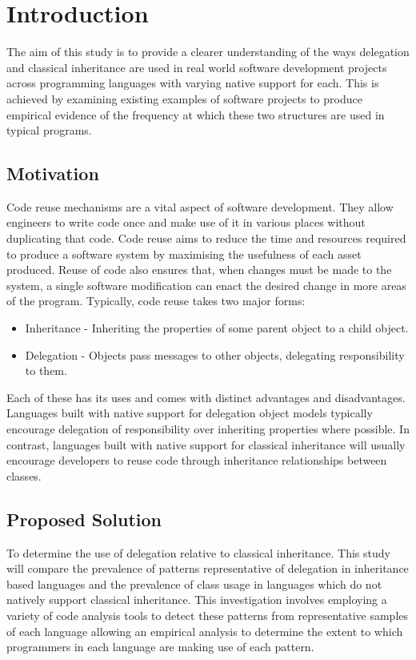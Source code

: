 \chapter{Introduction}\label{C:intro}
The aim of this study is to provide a clearer understanding of the ways delegation and classical inheritance are used in real world software development projects across programming languages with varying native support for each. This is achieved by examining existing examples of software projects to produce empirical evidence of the frequency at which these two structures are used in typical programs.

\section{Motivation}
Code reuse mechanisms are a vital aspect of software development. They allow engineers to write code once and make use of it in various places without duplicating that code. Code reuse aims to reduce the time and resources required to produce a software system by maximising the usefulness of each asset produced. Reuse of code also ensures that, when changes must be made to the system, a single software modification can enact the desired change in more areas of the program.
\newline
Typically, code reuse takes two major forms:
\begin{itemize}
	\item Inheritance - Inheriting the properties of some parent object to a child object.
	\item Delegation - Objects pass messages to other objects, delegating responsibility to them.
\end{itemize}
Each of these has its uses and comes with distinct advantages and disadvantages. Languages built with native support for delegation object models typically encourage delegation of responsibility over inheriting properties where possible. In contrast, languages built with native support for classical inheritance will usually encourage developers to reuse code through inheritance relationships between classes.

\section{Proposed Solution}
To determine the use of delegation relative to classical inheritance. This study will compare the prevalence of patterns representative of delegation in inheritance based languages and the prevalence of class usage in languages which do not natively support classical inheritance. This investigation involves employing a variety of code analysis tools to detect these patterns from representative samples of each language allowing an empirical analysis to determine the extent to which programmers in each language are making use of each pattern.


